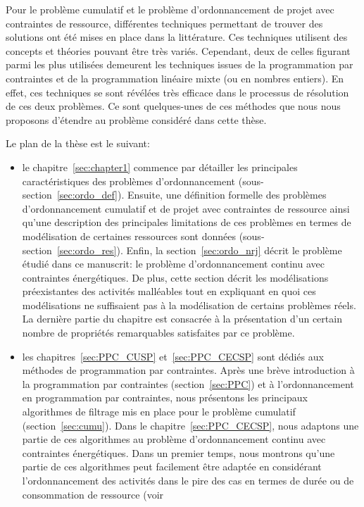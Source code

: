 Pour le problème cumulatif et le problème d'ordonnancement de projet
avec contraintes de ressource, différentes techniques permettant de
trouver des solutions ont été mises en place dans la littérature. Ces
techniques utilisent des concepts et théories pouvant être très
variés. Cependant, deux de celles figurant parmi les plus utilisées
demeurent les techniques issues de la programmation par contraintes et
de la programmation linéaire mixte (ou en nombres entiers). En effet,
ces techniques se sont révélées très efficace dans le processus de
résolution de ces deux problèmes. Ce sont quelques-unes de ces
méthodes que nous nous proposons d'étendre au problème considéré dans
cette thèse.

Le plan de la thèse est le suivant: 
\begin{itemize}
\item le chapitre~\ref{sec:chapter1} commence par détailler les
principales caractéristiques des problèmes d'ordonnancement
(sous-section~\ref{sec:ordo_def}). Ensuite, une définition formelle des
problèmes d'ordonnancement cumulatif et de projet
avec contraintes de ressource ainsi qu'une description des principales
limitations de ces problèmes en termes de modélisation de certaines
ressources sont données
(sous-section~\ref{sec:ordo_res}).  Enfin, la
section~\ref{sec:ordo_nrj} décrit le problème étudié dans ce 
manuscrit: le problème d'ordonnancement continu avec contraintes
énergétiques. De plus, cette section décrit les modélisations
préexistantes des activités malléables tout en expliquant en quoi ces
modélisations ne suffisaient pas à la modélisation de certains problèmes
réels. La dernière partie du chapitre est consacrée à la présentation
d'un certain nombre de propriétés remarquables satisfaites par ce problème.
\item les chapitres~\ref{sec:PPC_CUSP} et~\ref{sec:PPC_CECSP} sont
  dédiés aux méthodes de programmation par
  contraintes. Après une brève introduction à la programmation par
  contraintes (section~\ref{sec:PPC}) et à l'ordonnancement en
  programmation par contraintes, nous
  présentons les principaux algorithmes de filtrage mis en place pour
  le problème cumulatif (section~\ref{sec:cumu}). Dans le
  chapitre~\ref{sec:PPC_CECSP}, nous adaptons une partie de ces
  algorithmes au problème d'ordonnancement continu avec contraintes
  énergétiques. Dans un premier temps, nous montrons qu'une partie de
  ces algorithmes peut facilement être adaptée en considérant
  l'ordonnancement des activités dans le pire des cas en termes de
  durée ou de consommation de ressource (voir 

\end{itemize}
